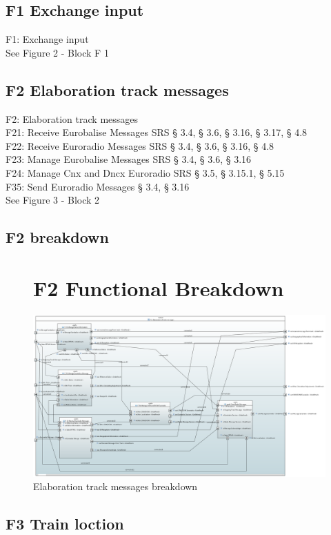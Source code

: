 \documentclass{template/openetcs_article}
\begin{document}
 \subsection{F1 Exchange input}
 F1: Exchange input\\
 See Figure 2 - Block F 1
 
  \subsection{F2 Elaboration track messages}
 F2: Elaboration track messages\\
 	F21: Receive Eurobalise Messages SRS § 3.4, § 3.6, § 3.16, § 3.17, § 4.8\\
 	F22: Receive Euroradio Messages SRS § 3.4, § 3.6, § 3.16, § 4.8\\
 	F23: Manage Eurobalise Messages SRS § 3.4, § 3.6, § 3.16\\
 	F24: Manage Cnx and Dncx Euroradio SRS § 3.5, § 3.15.1, § 5.15\\
 	F35: Send Euroradio Messages § 3.4, § 3.16\\
 	See Figure 3 - Block 2
 	
 \subsection{F2 breakdown}	
 \begin{figure}[hbtp]
\section{F2 Functional Breakdown}
\centering
\includegraphics [angle=90, scale=0.4] {images/F2_Breakdown}
\caption{Elaboration track messages breakdown}
\end{figure}

\newpage
\subsection{F3 Train loction}
\end{document}

